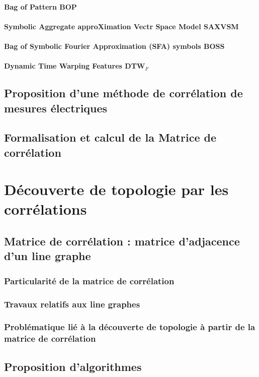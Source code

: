 \documentclass[onecolumn, 12pt]{book}
\begin{document}
			\subsubsection{Bag of Pattern BOP}
			\subsubsection{Symbolic Aggregate approXimation Vectr Space Model SAXVSM}
			\subsubsection{Bag of Symbolic Fourier Approximation (SFA) symbols BOSS}
			\subsubsection{Dynamic Time Warping Features DTW$_{F}$}
	\section{Proposition d'une m\'ethode de corr\'elation de mesures \'electriques}
	\section{Formalisation et calcul de la Matrice de corr\'elation}
	
\chapter{ D\'ecouverte de topologie par les corr\'elations }
	\section{Matrice de corr\'elation : matrice d'adjacence d'un line graphe}
		\subsection{Particularit\'e de la matrice de corr\'elation}
		\subsection{Travaux relatifs aux line graphes}
		\subsection{Probl\'ematique li\'e \`a la d\'ecouverte de topologie \`a partir de la matrice de corr\'elation}
	\section{Proposition d'algorithmes}
\end{document}
